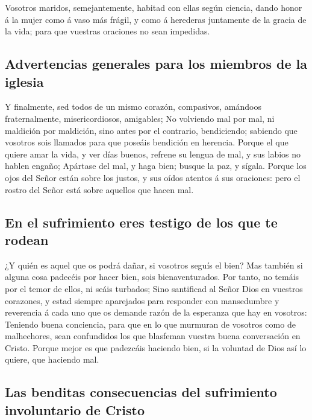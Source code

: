  Vosotros maridos, semejantemente, habitad con ellas según
ciencia, dando honor á la mujer como á vaso más frágil, y como á
herederas juntamente de la gracia de la vida; para que vuestras
oraciones no sean impedidas.

\hypertarget{advertencias-generales-para-los-miembros-de-la-iglesia}{%
\subsection{Advertencias generales para los miembros de la
iglesia}\label{advertencias-generales-para-los-miembros-de-la-iglesia}}

 Y finalmente, sed todos de un mismo corazón, compasivos,
amándoos fraternalmente, misericordiosos, amigables;  No
volviendo mal por mal, ni maldición por maldición, sino antes por el
contrario, bendiciendo; sabiendo que vosotros sois llamados para que
poseáis bendición en herencia.  Porque el que quiere amar
la vida, y ver días buenos, refrene su lengua de mal, y sus labios no
hablen engaño;  Apártase del mal, y haga bien; busque la
paz, y sígala.  Porque los ojos del Señor están sobre los
justos, y sus oídos atentos á sus oraciones: pero el rostro del Señor
está sobre aquellos que hacen mal.

\hypertarget{en-el-sufrimiento-eres-testigo-de-los-que-te-rodean}{%
\subsection{En el sufrimiento eres testigo de los que te
rodean}\label{en-el-sufrimiento-eres-testigo-de-los-que-te-rodean}}

 ¿Y quién es aquel que os podrá dañar, si vosotros seguís
el bien?  Mas también si alguna cosa padecéis por hacer
bien, sois bienaventurados. Por tanto, no temáis por el temor de ellos,
ni seáis turbados;  Sino santificad al Señor Dios en
vuestros corazones, y estad siempre aparejados para responder con
mansedumbre y reverencia á cada uno que os demande razón de la esperanza
que hay en vosotros:  Teniendo buena conciencia, para que
en lo que murmuran de vosotros como de malhechores, sean confundidos los
que blasfeman vuestra buena conversación en Cristo.  Porque
mejor es que padezcáis haciendo bien, si la voluntad de Dios así lo
quiere, que haciendo mal.

\hypertarget{las-benditas-consecuencias-del-sufrimiento-involuntario-de-cristo}{%
\subsection{Las benditas consecuencias del sufrimiento involuntario de
Cristo}\label{las-benditas-consecuencias-del-sufrimiento-involuntario-de-cristo}}

